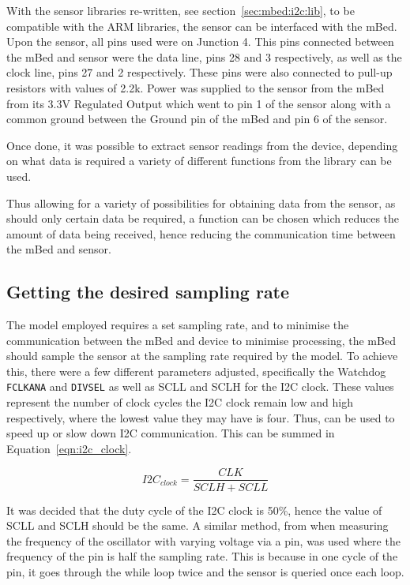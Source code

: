With the sensor libraries re-written, see section~\ref{sec:mbed:i2c:lib}, to be compatible with the ARM libraries, the sensor can be interfaced with the mBed. Upon the sensor, all pins used were on Junction 4. This pins connected between the mBed and sensor were the data line, pins 28 and 3 respectively, as well as the clock line, pins 27 and 2 respectively. These pins were also connected to pull-up resistors with values of 2.2k\ohm. Power was supplied to the sensor from the mBed from its 3.3V Regulated Output which went to pin 1 of the sensor along with a common ground between the Ground pin of the mBed and pin 6 of the sensor. 

Once done, it was possible to extract sensor readings from the device, depending on what data is required a variety of different functions from the library can be used.

Thus allowing for a variety of possibilities for obtaining data from the sensor, as should only certain data be required, a function can be chosen which reduces the amount of data being received, hence reducing the communication time between the mBed and sensor.

\subsection{Getting the desired sampling rate}

The model employed requires a set sampling rate, and to minimise the communication between the mBed and device to minimise processing, the mBed should sample the sensor at the sampling rate required by the model. To achieve this, there were a few different parameters adjusted, specifically the Watchdog \verb|FCLKANA| and \verb|DIVSEL| as well as SCLL and SCLH for the I2C clock. These values represent the number of clock cycles the I2C clock remain low and high respectively, where the lowest value they may have is four. Thus, can be used to speed up or slow down I2C communication. \cite{mbed_datasheet} This can be summed in Equation~\ref{eqn:i2c_clock}.

\begin{equation}
	I2C_{clock} = \frac{CLK}{SCLH + SCLL}
	\label{eqn:i2c_clock}
\end{equation}

It was decided that the duty cycle of the I2C clock is 50\%, hence the value of SCLL and SCLH should be the same. A similar method, from when measuring the frequency of the oscillator with varying voltage via a pin, was used where the frequency of the pin is half the sampling rate. This is because in one cycle of the pin, it goes through the while loop twice and the sensor is queried once each loop.

